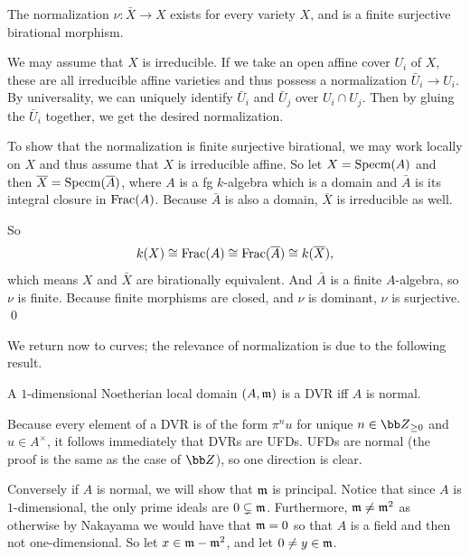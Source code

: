 \eproof

\bprop

    The normalization $\nu\colon\bar X\to X$ exists for every variety $X$, and is a finite surjective birational morphism.

\eprop

\bproof

    We may assume that $X$ is irreducible.
    If we take an open affine cover $U_i$ of $X$, these are all irreducible affine varieties and thus possess a normalization $\bar U_i\to U_i$.
    By universality, we can uniquely identify $\bar U_i$ and $\bar U_j$ over $U_i\cap U_j$.
    Then by gluing the $\bar U_i$ together, we get the desired normalization.

    To show that the normalization is finite surjective birational, we may work locally on $X$ and thus assume that $X$ is irreducible affine.
    So let $X={\rm Specm}(A)$ and then ${\overline{X}}={\rm Specm}({\overline{A}})$, where $A$ is a fg $k$-algebra which is a domain and $\bar A$ is its integral closure in ${\rm Frac}(A)$.
    Because $\bar A$ is also a domain, $\bar X$ is irreducible as well.

    So
    $$ k(X) \cong {\rm Frac}(A) \cong {\rm Frac}({\overline{A}}) \cong k({\overline{X}}) , $$
    which means $X$ and $\bar X$ are birationally equivalent.
    And $\bar A$ is a finite $A$-algebra, so $\nu$ is finite.
    Because finite morphisms are closed, and $\nu$ is dominant, $\nu$ is surjective.
    \qed

\eproof

We return now to curves; the relevance of normalization is due to the following result.

\bprop

    A $1$-dimensional Noetherian local domain $(A,{{\frak m}})$ is a DVR iff $A$ is normal.

\eprop

\bproof

    Because every element of a DVR is of the form $\pi^nu$ for unique $n\in\bZ_{\geq0}$ and $u\in A^\times$, it follows immediately that DVRs are UFDs.
    UFDs are normal (the proof is the same as the case of $\bZ$), so one direction is clear.

    Conversely if $A$ is normal, we will show that ${{\frak m}}$ is principal.
    Notice that since $A$ is $1$-dimensional, the only prime ideals are $0\subsetneq{{\frak m}}$.
    Furthermore, ${{\frak m}}\neq{{\frak m}}^2$ as otherwise by Nakayama we would have that ${{\frak m}}=0$ so that $A$ is a field and then not one-dimensional.
    So let $x\in{{\frak m}}-{{\frak m}}^2$, and let $0\neq y\in{{\frak m}}$.

